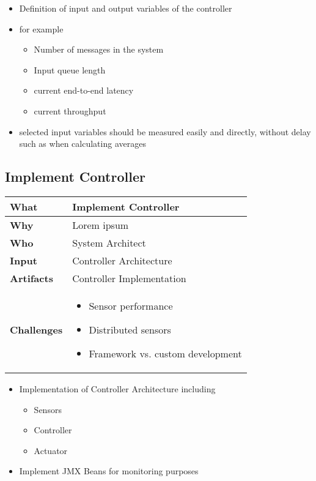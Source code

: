 \begin{itemize}
	\item Definition of input and output variables of the controller
	\item for example
	\begin{itemize}
		\item Number of messages in the system
		\item Input queue length
		\item current end-to-end latency
		\item current throughput
	\end{itemize}
	\item selected input variables should be measured easily and directly, without delay such as when calculating averages
\end{itemize}

\subsection{Implement Controller}
\begin{minipage}{\textwidth}
 \label{table:ch6_Task_Implement_Controller}
\begin{tabular}
	{|m{3cm}|m{10cm}|} \hline \bfseries What & Implement Controller\\
	\hline \bfseries Why & Lorem ipsum\\
	\hline \bfseries Who & System Architect\\
	\hline \bfseries Input & Controller Architecture\\
	\hline \bfseries Artifacts & Controller Implementation\\
	\hline \bfseries Challenges & 
		\begin{itemize}
			\item Sensor performance
			\item Distributed sensors 
			\item Framework vs. custom development
		\end{itemize}\\
	\hline 
\end{tabular}
\end{minipage}

\begin{itemize}
	\item Implementation of Controller Architecture including
	\begin{itemize}
		\item Sensors
		\item Controller
		\item Actuator
	\end{itemize}
	\item Implement JMX Beans for monitoring purposes
\end{itemize}

